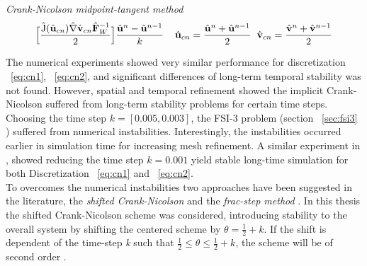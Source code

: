 \begin{discr}
\textit{Crank-Nicolson midpoint-tangent method}
\begin{align*}
\Big[\frac{\text{\^{J}}(\hat{\mathbf{u}}_{cn}) \hat{\mathbf{\nabla}} \hat{\mathbf{v}}_{cn} \hat{\mathbf{F}}_W^{-1}}{2} \Big] 
\frac{\hat{\mathbf{u}}^{n} - \hat{\mathbf{u}}^{n-1}}{k} \hspace{4mm}
\hat{\mathbf{u}}_{cn} = \frac{\hat{\mathbf{u}}^{n} + \hat{\mathbf{u}}^{n-1}}{2} \hspace{2mm}
\hat{\mathbf{v}}_{cn} = \frac{\hat{\mathbf{v}}^{n} + \hat{\mathbf{v}}^{n-1}}{2}
\end{align*} 
\label{eq:cn2}
\end{discr}
\newpage
The numerical experiments showed very similar performance for discretization ~\ref{eq:cn1}, ~\ref{eq:cn2}, and significant differences of long-term temporal stability was not found. However, spatial and temporal refinement showed the implicit Crank-Nicolson suffered from long-term stability problems for certain time steps. Choosing the time step $k = [0.005, 0.003]$, the FSI-3 problem (section ~\ref{sec:fsi3} ) suffered from numerical instabilities. Interestingly, the instabilities occurred earlier in simulation time for increasing mesh refinement. A similar experiment in \cite{Wicka}, showed reducing the time step $k = 0.001$ yield stable long-time simulation for both Discretization ~\ref{eq:cn1} and ~\ref{eq:cn2}. \\
To overcomes the numerical instabilities two approaches have been suggested in the literature, the \textit{shifted Crank-Nicolson} and the \textit{frac-step method} \cite{Richter2015, Wicka, Wick2013a}. In this thesis the shifted Crank-Nicolson scheme was considered, introducing stability to the overall system by shifting the centered scheme by $\theta = \frac{1}{2} + k$. If the shift is dependent of the time-step \textit{k} such that $\frac{1}{2} \leq \theta \leq \frac{1}{2} + k$, the scheme will be of second order \cite{Richter2015}. \\
